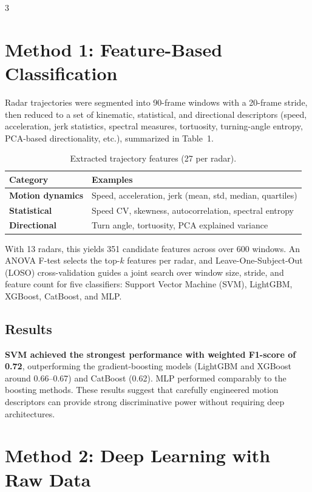 \documentclass[final]{beamer}
\begin{document}
\begin{frame}[t]
\begin{multicols}{3}
\section{Method 1: Feature-Based Classification}

Radar trajectories were segmented into 90-frame windows with a 20-frame stride, then reduced to a set of kinematic, statistical, and directional descriptors (speed, acceleration, jerk statistics, spectral measures, tortuosity, turning-angle entropy, PCA-based directionality, etc.), summarized in Table~1.

\begin{table}
\centering
\small
\begin{tabularx}{\columnwidth}{>{\bfseries}l X}
\toprule
Category & Examples \\
\midrule
Motion dynamics &
Speed, acceleration, jerk (mean, std, median, quartiles) \\

Statistical &
Speed CV, skewness, autocorrelation, spectral entropy \\

Directional &
Turn angle, tortuosity, PCA explained variance \\
\bottomrule
\end{tabularx}
\caption{Extracted trajectory features (27 per radar).}
\end{table}

With 13 radars, this yields 351 candidate features across over 600 windows. An ANOVA F-test selects the top-$k$ features per radar, and Leave-One-Subject-Out (LOSO) cross-validation guides a joint search over window size, stride, and feature count for five classifiers: Support Vector Machine (SVM), LightGBM, XGBoost, CatBoost, and MLP.

\subsection{Results}

\textbf{SVM achieved the strongest performance with weighted F1-score of 0.72}, outperforming the gradient-boosting models (LightGBM and XGBoost around 0.66--0.67) and CatBoost (0.62). MLP performed comparably to the boosting methods. These results suggest that carefully engineered motion descriptors can provide strong discriminative power without requiring deep architectures.

\vfill\null
\columnbreak

\section{Method 2: Deep Learning with Raw Data}


\end{multicols}
\end{frame}
\end{document}
